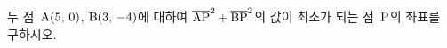 두 점~$\mathrm{A}(5,\mkern3mu 0)$, $\mathrm{B}(3,\mkern3mu -4)$에 대하여 $\overline{\mathrm{AP}}^2+\overline{\mathrm{BP}}^2$의 값이 최소가 되는 점~$\mathrm{P}$의 좌표를 구하시오.
